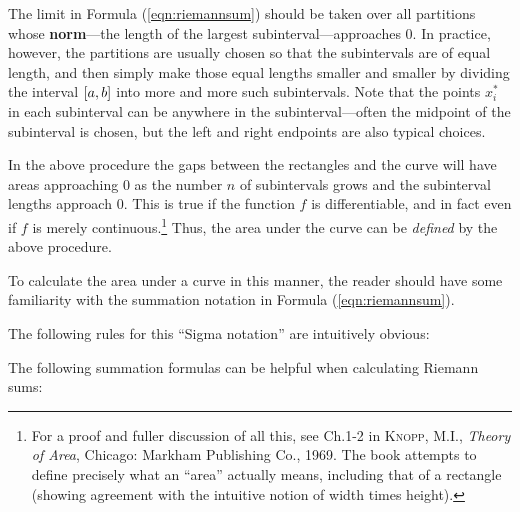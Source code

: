 The limit in Formula (\ref{eqn:riemannsum}) should be taken over all partitions
whose \textbf{norm}---the length of the largest subinterval---approaches
0. In practice,
however, the partitions are usually chosen so that the subintervals are of equal
length, and then simply make those equal lengths smaller and smaller by
dividing the interval $\lbrack a,b \rbrack$ into more and more such subintervals.
Note that the points $x_i^*$ in each subinterval can be anywhere in the
subinterval---often the midpoint of the subinterval is
chosen, but the left and right endpoints are also typical choices.

In the above procedure the gaps between the rectangles and the curve will have
areas approaching 0 as the number $n$ of subintervals grows and the
subinterval lengths approach 0. This is true if the function $f$ is
differentiable, and in fact even if $f$ is merely continuous.\footnote{For a
proof and fuller discussion of all this, see Ch.1-2 in \textsc{Knopp, M.I.},
\emph{Theory of Area}, Chicago: Markham Publishing Co., 1969. The book
attempts to define precisely what an ``area'' actually means, including
that of a rectangle (showing agreement with the intuitive notion of width times
height).} Thus, the area under the curve can be \emph{defined} by the above
procedure. 

To calculate the area under a curve in this manner, the reader should have some
familiarity with the summation notation in Formula (\ref{eqn:riemannsum}).


The following rules for this ``Sigma notation'' are intuitively obvious:

\newpage
\noindent The following summation formulas can be helpful when calculating
Riemann sums:


